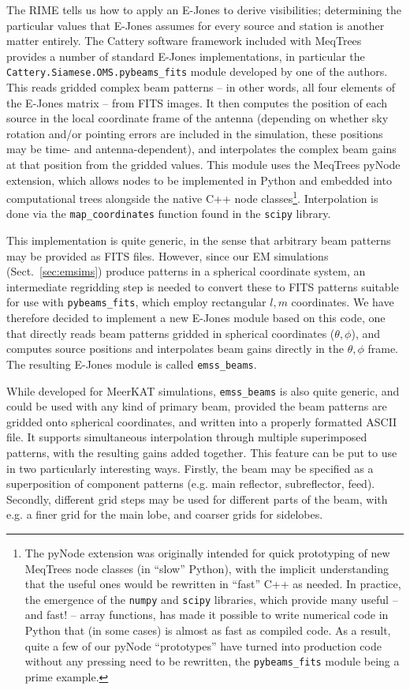 \documentclass{aa}
\begin{document}
The RIME tells us how to apply an E-Jones to derive visibilities; determining the particular values that 
E-Jones assumes for every source and station is another matter entirely. The Cattery software framework included with MeqTrees provides a number of standard E-Jones implementations, in particular the
{\tt Cattery.Siamese.OMS.pybeams\_fits} module developed by one of the authors. This reads gridded complex beam patterns -- in other words, all four elements of the E-Jones matrix -- from FITS images. It then computes the position of each source in the local coordinate frame of the antenna (depending on whether sky rotation and/or pointing errors are included in the simulation, these positions may be time- and antenna-dependent), and interpolates the complex beam gains at that position from the gridded values. This module uses the MeqTrees pyNode extension, which allows nodes to be implemented in Python and embedded into computational trees alongside the native C++ node classes\footnote{The pyNode extension was originally intended for quick prototyping of new MeqTrees node classes (in ``slow'' Python), with the implicit understanding that the useful ones would be rewritten in ``fast'' C++ as needed. In practice, the emergence of the {\tt numpy} and {\tt scipy} libraries, which provide many useful -- and fast! -- array functions, has made it possible to write numerical code in Python that (in some cases) is almost as fast as compiled code. As a result, quite a few of our pyNode ``prototypes'' have turned into production code without any pressing need to be rewritten, the {\tt pybeams\_fits} module being a prime example.}. Interpolation is done via the {\tt map\_coordinates} function found in the {\tt scipy} library. 

This implementation is quite generic, in the sense that arbitrary beam patterns may be provided as FITS files. However, since our EM simulations (Sect.~\ref{sec:emsims}) produce patterns in a spherical coordinate system, an intermediate regridding step is needed to convert these to FITS patterns suitable for use with {\tt pybeams\_fits}, which employ rectangular $l,m$ coordinates. We have therefore decided to implement a new E-Jones module based on this code, one that directly reads beam patterns gridded in spherical coordinates ($\theta,\phi$), and computes source positions and interpolates beam gains directly in the $\theta,\phi$ frame. The resulting E-Jones module is called {\tt emss\_beams}.

While developed for MeerKAT simulations, {\tt emss\_beams} is also quite generic, and could be used with any kind of primary beam, provided the beam patterns are gridded onto spherical coordinates, and written into a properly formatted ASCII file. It supports simultaneous interpolation through multiple superimposed patterns, with the resulting gains added together. This feature can be put to use in two particularly interesting ways. Firstly, the beam may be specified as a superposition of component patterns (e.g. main reflector, subreflector, feed). Secondly, different grid steps may be used for different parts of the beam, with e.g. a finer grid for the main lobe, and coarser grids for sidelobes. 
\end{document}
